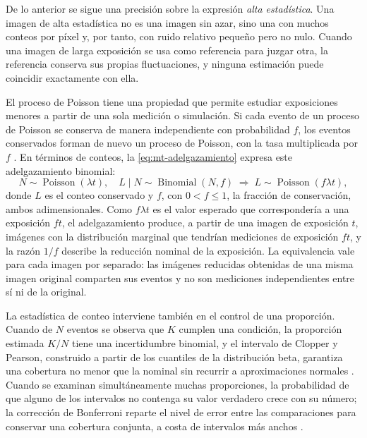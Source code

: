 De lo anterior se sigue una precisión sobre la expresión \emph{alta estadística}. Una imagen de alta estadística no es una imagen sin azar, sino una con muchos conteos por píxel y, por tanto, con ruido relativo pequeño pero no nulo. Cuando una imagen de larga exposición se usa como referencia para juzgar otra, la referencia conserva sus propias fluctuaciones, y ninguna estimación puede coincidir exactamente con ella.

El proceso de Poisson tiene una propiedad que permite estudiar exposiciones menores a partir de una sola medición o simulación. Si cada evento de un proceso de Poisson se conserva de manera independiente con probabilidad $f$, los eventos conservados forman de nuevo un proceso de Poisson, con la tasa multiplicada por $f$ \parencite{kingman1992}. En términos de conteos, la \cref{eq:mt-adelgazamiento} expresa este adelgazamiento binomial:
\begin{equation}\label{eq:mt-adelgazamiento}
N\sim\operatorname{Poisson}(\lambda t),\quad L\mid N\sim\operatorname{Binomial}(N,f)\;\Longrightarrow\;L\sim\operatorname{Poisson}(f\lambda t),
\end{equation}
donde $L$ es el conteo conservado y $f$, con $0<f\le1$, la fracción de conservación, ambos adimensionales. Como $f\lambda t$ es el valor esperado que correspondería a una exposición $ft$, el adelgazamiento produce, a partir de una imagen de exposición $t$, imágenes con la distribución marginal que tendrían mediciones de exposición $ft$, y la razón $1/f$ describe la reducción nominal de la exposición. La equivalencia vale para cada imagen por separado: las imágenes reducidas obtenidas de una misma imagen original comparten sus eventos y no son mediciones independientes entre sí ni de la original.

La estadística de conteo interviene también en el control de una proporción. Cuando de $N$ eventos se observa que $K$ cumplen una condición, la proporción estimada $K/N$ tiene una incertidumbre binomial, y el intervalo de Clopper y Pearson, construido a partir de los cuantiles de la distribución beta, garantiza una cobertura no menor que la nominal sin recurrir a aproximaciones normales \parencite{clopper1934}. Cuando se examinan simultáneamente muchas proporciones, la probabilidad de que alguno de los intervalos no contenga su valor verdadero crece con su número; la corrección de Bonferroni reparte el nivel de error entre las comparaciones para conservar una cobertura conjunta, a costa de intervalos más anchos \parencite{dunn1961}.

